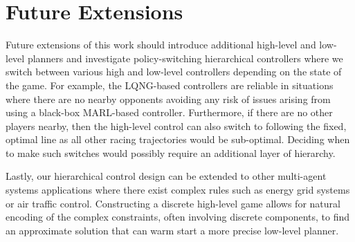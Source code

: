 \section{Future Extensions}
Future extensions of this work should introduce additional high-level and low-level planners and investigate policy-switching hierarchical controllers where we switch between various high and low-level controllers depending on the state of the game. For example, the LQNG-based controllers are reliable in situations where there are no nearby opponents avoiding any risk of issues arising from using a black-box MARL-based controller. Furthermore, if there are no other players nearby, then the high-level control can also switch to following the fixed, optimal line as all other racing trajectories would be sub-optimal. Deciding when to make such switches would possibly require an additional layer of hierarchy.

Lastly, our hierarchical control design can be extended to other multi-agent systems applications where there exist complex rules such as energy grid systems or air traffic control. Constructing a discrete high-level game allows for natural encoding of the complex constraints, often involving discrete components, to find an approximate solution that can warm start a more precise low-level planner.